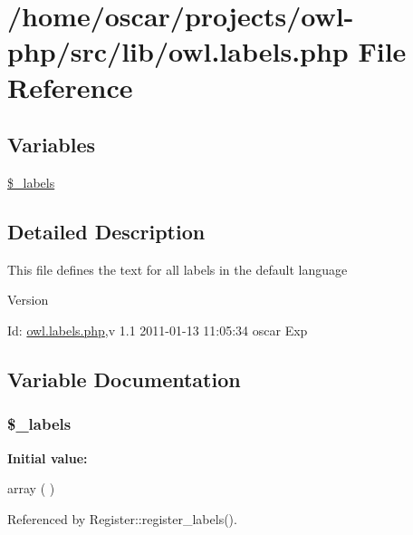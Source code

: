 \section{/home/oscar/projects/owl-\/php/src/lib/owl.labels.php File Reference}
\label{owl_8labels_8php}
\subsection*{Variables}
\begin{DoxyCompactItemize}
\item 
\hyperlink{owl_8labels_8php_a2ec9873ed5b12f5516e61365717fa6c0}{\$\_\-labels}
\end{DoxyCompactItemize}


\subsection{Detailed Description}
This file defines the text for all labels in the default language \begin{DoxyVersion}{Version}

\end{DoxyVersion}
\begin{DoxyParagraph}{Id:}
\hyperlink{owl_8labels_8php}{owl.labels.php},v 1.1 2011-\/01-\/13 11:05:34 oscar Exp 
\end{DoxyParagraph}


\subsection{Variable Documentation}
\subsubsection[{\$\_\-labels}]{\setlength{\rightskip}{0pt plus 5cm}\$\_\-labels}\label{owl_8labels_8php_a2ec9873ed5b12f5516e61365717fa6c0}
{\bfseries Initial value:}
\begin{DoxyCode}
 array (
)
\end{DoxyCode}


Referenced by Register::register\_\-labels().

